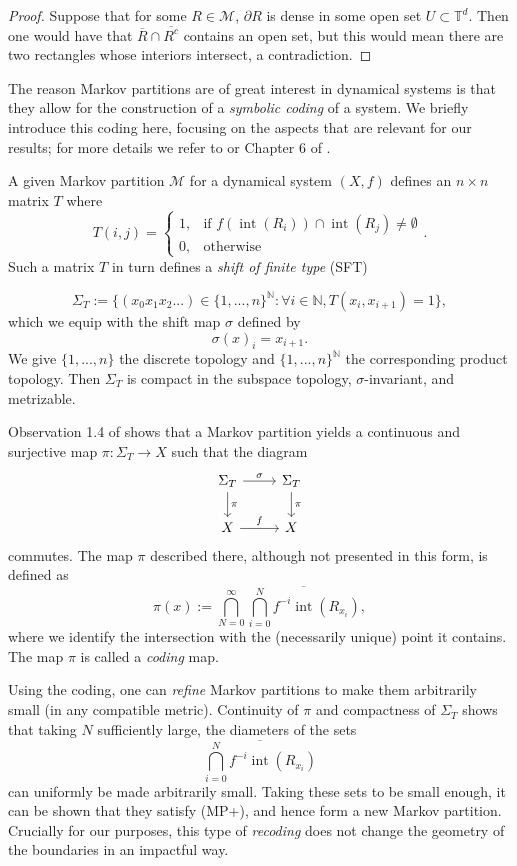 \documentclass{article}
\def\N{\mathbb{N}}
\def\T{\mathbb{T}}
\def\M{\mathcal{M}}
\begin{document}
\begin{proof}
    Suppose that for some $R\in\M$, $\partial R$ is dense in some open set $U\subset \T^d$. Then one would have that $\overline{R}\cap\overline{R^c}$ contains an open set, but this would mean there are two rectangles whose interiors intersect, a contradiction. 
\end{proof}

The reason Markov partitions are of great interest in dynamical systems is that they allow for the construction of a \textit{symbolic coding} of a system. We briefly introduce this coding here, focusing on the aspects that are relevant for our results; for more details we refer to \cite{AKS} or Chapter 6 of \cite{LM}. 

A given Markov partition $\M$ for a dynamical system $(X,f)$ defines an $n\times n$ matrix $T$ where $$T(i,j)=\begin{cases}
    1,& \text{if } f(\operatorname{int}(R_i))\cap \operatorname{int}(R_j) \neq \emptyset \\
    0,& \text{otherwise}
\end{cases}.$$ Such a matrix $T$ in turn defines a \textit{shift of finite type} (SFT) 

$$\Sigma_T:=\{(x_0x_1x_2...)\in \{1,...,n\}^\N:\forall i\in\N, T(x_i,x_{i+1})=1\},$$ which we equip with the shift map $\sigma$ defined by $$\sigma(x)_i=x_{i+1}.$$ We give $\{1,...,n\}$ the discrete topology and $\{1,...,n\}^\N$ the corresponding product topology. Then $\Sigma_T$ is compact in the subspace topology, $\sigma$-invariant, and metrizable. 

Observation 1.4 of \cite{AKS} shows that a Markov partition yields a continuous and surjective map $\pi:\Sigma_T\to X$ such that the diagram
$$\begin{tikzcd}
\Sigma_T \arrow[r, "\sigma"] \arrow[d, "\pi"] & \Sigma_T \arrow[d, "\pi"] \\
X \arrow[r, "f"]                              & X                        
\end{tikzcd}$$ commutes. The map $\pi$ described there, although not presented in this form, is defined as $$\pi(x):=\bigcap_{N=0}^\infty \overline{\bigcap_{i=0}^Nf^{-i}\operatorname{int}(R_{x_i})},$$ where we identify the intersection with the (necessarily unique) point it contains. The map $\pi$ is called a \textit{coding} map.

Using the coding, one can \textit{refine} Markov partitions to make them arbitrarily small (in any compatible metric). Continuity of $\pi$ and compactness of $\Sigma_T$ shows that taking $N$ sufficiently large, the diameters of the sets $$\overline{\bigcap_{i=0}^Nf^{-i}\operatorname{int}(R_{x_i})}$$ can uniformly be made arbitrarily small. Taking these sets to be small enough, it can be shown that they satisfy (MP+), and hence form a new Markov partition. Crucially for our purposes, this type of \textit{recoding} does not change the geometry of the boundaries in an impactful way.
\end{document}
